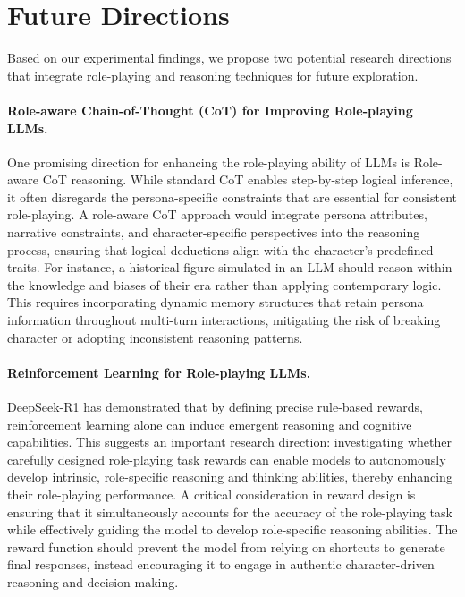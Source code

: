 \section{Future Directions}
Based on our experimental findings, we propose two potential research directions that integrate role-playing and reasoning techniques for future exploration.

\noindent \paragraph{Role-aware Chain-of-Thought (CoT) for Improving Role-playing LLMs.}
One promising direction for enhancing the role-playing ability of LLMs is Role-aware CoT reasoning. 
While standard CoT enables step-by-step logical inference, it often disregards the persona-specific constraints that are essential for consistent role-playing. 
A role-aware CoT approach would integrate persona attributes, narrative constraints, and character-specific perspectives into the reasoning process, ensuring that logical deductions align with the character's predefined traits. 
For instance, a historical figure simulated in an LLM should reason within the knowledge and biases of their era rather than applying contemporary logic. 
This requires incorporating dynamic memory structures that retain persona information throughout multi-turn interactions, mitigating the risk of breaking character or adopting inconsistent reasoning patterns.

\noindent\paragraph{Reinforcement Learning for Role-playing LLMs.}

DeepSeek-R1 has demonstrated that by defining precise rule-based rewards, reinforcement learning alone can induce emergent reasoning and cognitive capabilities. This suggests an important research direction: investigating whether carefully designed role-playing task rewards can enable models to autonomously develop intrinsic, role-specific reasoning and thinking abilities, thereby enhancing their role-playing performance.
A critical consideration in reward design is ensuring that it simultaneously accounts for the accuracy of the role-playing task while effectively guiding the model to develop role-specific reasoning abilities. The reward function should prevent the model from relying on shortcuts to generate final responses, instead encouraging it to engage in authentic character-driven reasoning and decision-making.